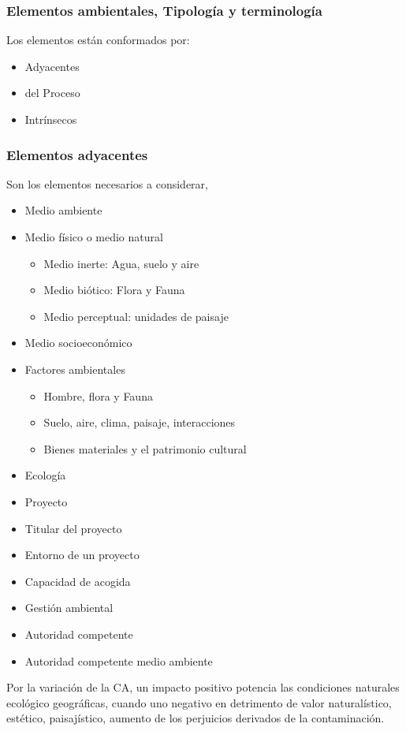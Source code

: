 \subsubsection{Elementos ambientales, Tipología y terminología}
Los elementos están conformados por:
\begin{itemize}
    \item Adyacentes
    \item del Proceso
    \item Intrínsecos
\end{itemize}

\subsubsection{Elementos adyacentes}
Son los elementos necesarios a considerar,
\begin{itemize}
    \item Medio ambiente
    \item Medio físico o medio natural \begin{itemize}
        \item Medio inerte: Agua, suelo y aire
        \item Medio biótico: Flora y Fauna
        \item Medio perceptual: unidades de paisaje
    \end{itemize}
    \item Medio socioeconómico
    \item Factores ambientales \begin{itemize}
        \item Hombre, flora y Fauna
        \item Suelo, aire, clima, paisaje, interacciones
        \item Bienes materiales y el patrimonio cultural
    \end{itemize}
    \item Ecología
    \item Proyecto
    \item Titular del proyecto
    \item Entorno de un proyecto
    \item Capacidad de acogida
    \item Gestión ambiental
    \item Autoridad competente
    \item Autoridad competente medio ambiente
\end{itemize}
Por la variación de la CA, un impacto positivo potencia las condiciones naturales ecológico geográficas, cuando uno negativo en detrimento de valor naturalístico, estético, paisajístico, aumento de los perjuicios derivados de la contaminación.

